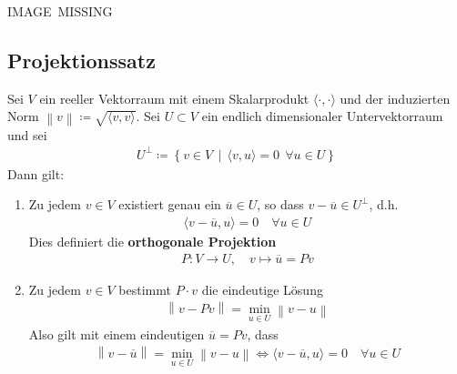 \documentclass[ngerman,fontsize=11pt, paper=a4, parskip=half, titlepage=true, toc=bib]{scrbook}
\newcommand{\nn}[1]{\left\| #1 \right\|}
\newcommand{\scp}[2]{\langle #1, #2 \rangle}
\begin{document}
	IMAGE~MISSING\\
	
	\subsection{Projektionssatz}  \label{4.3.3}
	Sei $V$ ein reeller Vektorraum mit einem Skalarprodukt $\scp{\cdot}{\cdot}$
	und der induzierten Norm $\nn{v}\coloneqq \sqrt{\scp{v}{v}}$.
	Sei $U\subset V$ ein endlich dimensionaler Untervektorraum und sei
	\begin{gather*}
		U^\bot \coloneqq \left\{ v\in V  \, \middle\vert \, \scp{v}{u} = 0 ~~ \forall u\in U \right\}
	\end{gather*}
	Dann gilt:
	\begin{enumerate}[1)]
		\item Zu jedem $v\in V$ existiert genau ein $\overline{u}\in U$, 
		so dass $v-\overline{u}\in U^\bot$, d.h.
				\begin{gather*}
					\scp{v-\overline{u}}{u} = 0 \quad \forall u \in U
				\end{gather*}
		Dies definiert die \textbf{orthogonale Projektion} 
		\begin{gather*}
			P:V\rightarrow U, \quad v\mapsto \overline{u}= Pv
		\end{gather*}
		\item Zu jedem $v\in V $ bestimmt $P\cdot v$ die eindeutige Lösung
		\begin{gather*}
			\nn{v-Pv}= \min_{u\in U} \nn{v-u}
		\end{gather*}
		Also gilt mit einem eindeutigen $\overline{u}= Pv$, dass 
		\begin{gather}
			\nn{v-\overline{u}} = \min_{u\in U} \nn{v-u} 
			\Longleftrightarrow \scp{v-\overline{u}}{u} = 0 \quad \forall u\in U
			\label{IV.3.3}
		\end{gather}
	\end{enumerate}
	
\end{document}
